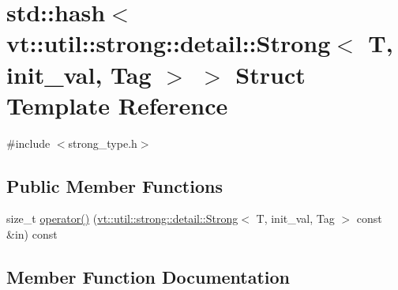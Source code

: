 \hypertarget{structstd_1_1hash_3_01vt_1_1util_1_1strong_1_1detail_1_1_strong_3_01_t_00_01init__val_00_01_tag_01_4_01_4}{}\section{std\+:\+:hash$<$ vt\+:\+:util\+:\+:strong\+:\+:detail\+:\+:Strong$<$ T, init\+\_\+val, Tag $>$ $>$ Struct Template Reference}
\label{structstd_1_1hash_3_01vt_1_1util_1_1strong_1_1detail_1_1_strong_3_01_t_00_01init__val_00_01_tag_01_4_01_4}


{\ttfamily \#include $<$strong\+\_\+type.\+h$>$}

\subsection*{Public Member Functions}
\begin{DoxyCompactItemize}
\item 
size\+\_\+t \hyperlink{structstd_1_1hash_3_01vt_1_1util_1_1strong_1_1detail_1_1_strong_3_01_t_00_01init__val_00_01_tag_01_4_01_4_aeb7e55261b49c523830613deec8cfd54}{operator()} (\hyperlink{structvt_1_1util_1_1strong_1_1detail_1_1_strong}{vt\+::util\+::strong\+::detail\+::\+Strong}$<$ T, init\+\_\+val, Tag $>$ const \&in) const
\end{DoxyCompactItemize}


\subsection{Member Function Documentation}
\mbox{\label{structstd_1_1hash_3_01vt_1_1util_1_1strong_1_1detail_1_1_strong_3_01_t_00_01init__val_00_01_tag_01_4_01_4_aeb7e55261b49c523830613deec8cfd54}} 
